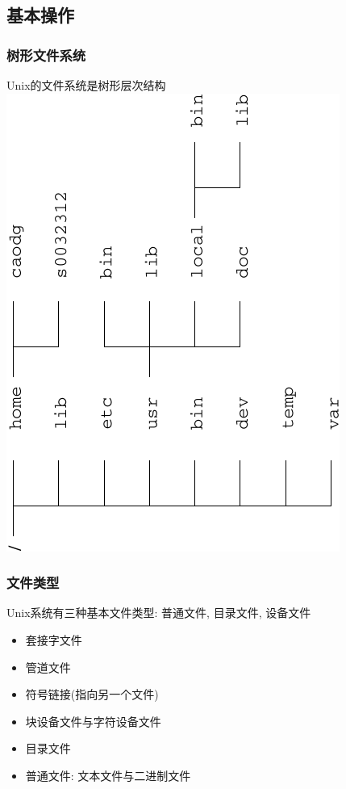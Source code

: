 \documentclass[compress]{beamer}
\begin{document}
\subsection{基本操作}

\begin{frame}
\frametitle{树形文件系统}

Unix的文件系统是树形层次结构\\
\includegraphics[scale=0.8,angle=-90]{directory.pdf}

\end{frame}

\begin{frame}
\frametitle{文件类型}
Unix系统有三种基本文件类型: 普通文件, 目录文件, 设备文件

\begin{itemize}

\item 套接字文件
\item 管道文件
\item 符号链接(指向另一个文件)
\item 块设备文件与字符设备文件
\item 目录文件
\item 普通文件: 文本文件与二进制文件
\end{itemize}

\end{frame}
\end{document}
